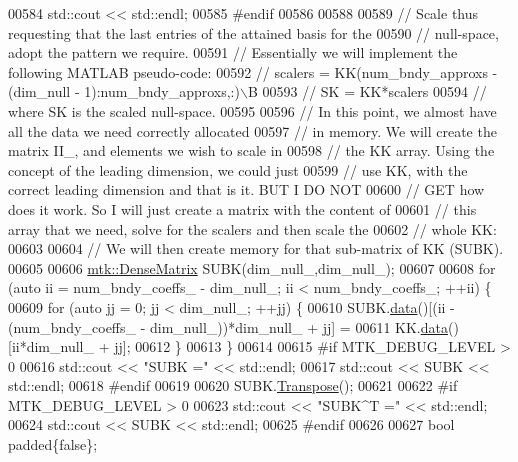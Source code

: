 \begin{DoxyCode}
{{00584   std::cout << std::endl;
00585 \textcolor{preprocessor}{  #endif}
00586 
00588 
00589   \textcolor{comment}{// Scale thus requesting that the last entries of the attained basis for the}
00590   \textcolor{comment}{// null-space, adopt the pattern we require.}
00591   \textcolor{comment}{// Essentially we will implement the following MATLAB pseudo-code:}
00592   \textcolor{comment}{//  scalers = KK(num\_bndy\_approxs - (dim\_null - 1):num\_bndy\_approxs,:)\(\backslash\)B}
00593   \textcolor{comment}{//  SK = KK*scalers}
00594   \textcolor{comment}{// where SK is the scaled null-space.}
00595 
00596   \textcolor{comment}{// In this point, we almost have all the data we need correctly allocated}
00597   \textcolor{comment}{// in memory. We will create the matrix II\_, and elements we wish to scale in}
00598   \textcolor{comment}{// the KK array. Using the concept of the leading dimension, we could just}
00599   \textcolor{comment}{// use KK, with the correct leading dimension and that is it. BUT I DO NOT}
00600   \textcolor{comment}{// GET how does it work. So I will just create a matrix with the content of}
00601   \textcolor{comment}{// this array that we need, solve for the scalers and then scale the}
00602   \textcolor{comment}{// whole KK:}
00603 
00604   \textcolor{comment}{// We will then create memory for that sub-matrix of KK (SUBK).}
00605 
00606   \hyperlink{classmtk_1_1DenseMatrix}{mtk::DenseMatrix} SUBK(dim\_null\_,dim\_null\_);
00607 
00608   \textcolor{keywordflow}{for} (\textcolor{keyword}{auto} ii = num\_bndy\_coeffs\_ - dim\_null\_; ii < num\_bndy\_coeffs\_; ++ii) \{
00609     \textcolor{keywordflow}{for} (\textcolor{keyword}{auto} jj = 0; jj < dim\_null\_; ++jj) \{
00610       SUBK.\hyperlink{classmtk_1_1DenseMatrix_a16b3ff56feb2658b9fc7147d1de4d8e7}{data}()[(ii - (num\_bndy\_coeffs\_ - dim\_null\_))*dim\_null\_ + jj] =
00611           KK.\hyperlink{classmtk_1_1DenseMatrix_a16b3ff56feb2658b9fc7147d1de4d8e7}{data}()[ii*dim\_null\_ + jj];
00612     \}
00613   \}
00614 
00615 \textcolor{preprocessor}{  #if MTK\_DEBUG\_LEVEL > 0}
00616   std::cout << \textcolor{stringliteral}{"SUBK ="} << std::endl;
00617   std::cout << SUBK << std::endl;
00618 \textcolor{preprocessor}{  #endif}
00619 
00620   SUBK.\hyperlink{classmtk_1_1DenseMatrix_a71d9c07ca66e88d97d1fd5012f43138b}{Transpose}();
00621 
00622 \textcolor{preprocessor}{  #if MTK\_DEBUG\_LEVEL > 0}
00623   std::cout << \textcolor{stringliteral}{"SUBK^T ="} << std::endl;
00624   std::cout << SUBK << std::endl;
00625 \textcolor{preprocessor}{  #endif}
00626 
00627   \textcolor{keywordtype}{bool} padded\{\textcolor{keyword}{false}\};
}}
\end{DoxyCode}

